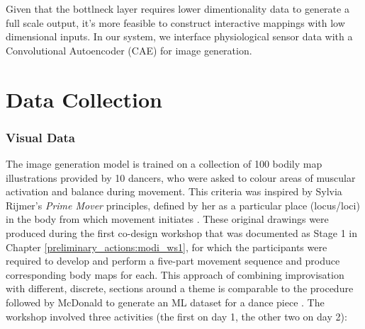Given that the bottlneck layer requires lower dimentionality data to generate a full scale output, it's more feasible to construct interactive mappings with low dimensional inputs. In our system, we interface physiological sensor data with a Convolutional Autoencoder (CAE) for image generation.

\section{Data Collection}

\subsubsection*{Visual Data}

The image generation model is trained on a collection of 100 bodily map illustrations provided by 10 dancers, who were asked to colour areas of muscular activation and balance during movement. This criteria was inspired by Sylvia Rijmer's \textit{Prime Mover} principles, defined by her as a particular place (locus/loci) in the body from which movement initiates \cite{jurgens_designing_2020, rijmer_negotiating_2022}. These original drawings were produced during the first co-design workshop that was documented as Stage 1 in Chapter \ref{preliminary_actions:modi_ws1}, for which the participants were required to develop and perform a five-part movement sequence and produce corresponding body maps for each. This approach of combining improvisation with different, discrete, sections around a theme is comparable to the procedure followed by McDonald to generate an ML dataset for a dance piece \cite{mcdonald_dance_2018}. The workshop involved three activities (the first on day 1, the other two on day 2):

